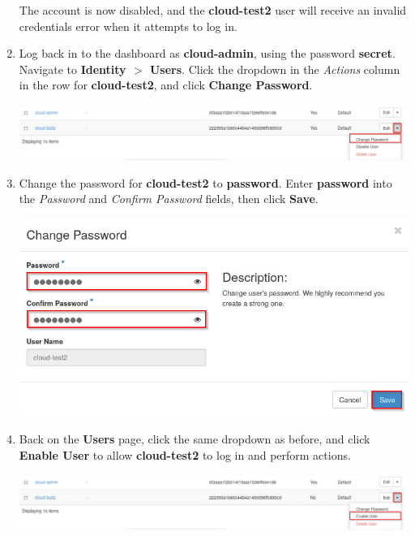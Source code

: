 \documentclass[letterpaper, 12pt]{article}
\begin{document}
\begin{enumerate}
    \begin{notebox}
        The account is now disabled, and the \textbf{cloud-test2} user will receive an invalid credentials error when it attempts to log in.
    \end{notebox}

    \item Log back in to the dashboard as \textbf{cloud-admin}, using the password \textbf{secret}.
    Navigate to \textbf{Identity $>$ Users}.
    Click the dropdown in the \textit{Actions} column in the row for \textbf{cloud-test2}, and click \textbf{Change Password}.

    \begin{center}
        \includegraphics[width=\linewidth]{images/part3/step15.png}
    \end{center}

    \item Change the password for \textbf{cloud-test2} to \textbf{password}. Enter \textbf{password} into the
    \textit{Password} and \textit{Confirm Password} fields, then click \textbf{Save}.

    \begin{center}
        \includegraphics[width=\linewidth]{images/part3/step16.png}
    \end{center}

    \item Back on the \textbf{Users} page, click the same dropdown as before, and click \textbf{Enable User} to allow \textbf{cloud-test2} to log in and perform actions.

    \begin{center}
        \includegraphics[width=\linewidth]{images/part3/step17.png}
    \end{center}


\end{enumerate}
\end{document}
